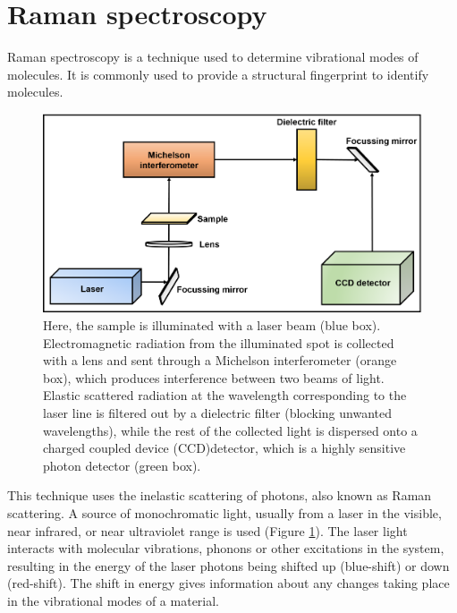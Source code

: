\section{Raman spectroscopy}

Raman spectroscopy is a technique used to determine vibrational modes of molecules. It is commonly used to provide a structural fingerprint to identify molecules.
\begin{figure}[tbh!]
\centering
\includegraphics[width=\textwidth]{Figures/Raman}
\caption{Here, the sample is illuminated with a laser beam (blue box). Electromagnetic radiation from the illuminated spot is collected with a lens and sent through a Michelson interferometer (orange box), which produces interference between two beams of light. Elastic scattered radiation at the wavelength corresponding to the laser line is filtered out by a dielectric filter (blocking unwanted wavelengths), while the rest of the collected light is dispersed onto a charged coupled device (CCD)detector, which is a highly sensitive photon detector (green box).}
\label{Figures:Raman}
\end{figure}
This technique uses the inelastic scattering of photons, also known as Raman scattering. A source of monochromatic light, usually from a laser in the visible, near infrared, or near ultraviolet range is used (Figure \ref{Figures:Raman}). The laser light interacts with molecular vibrations, phonons or other excitations in the system, resulting in the energy of the laser photons being shifted up (blue-shift) or down (red-shift). The shift in energy gives information about any changes taking place in the vibrational modes of a material. 


